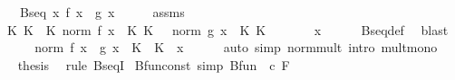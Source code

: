 \begin{isabellebody}
\ \ \ {\isachardoublequoteopen}Bseq\ {\isacharparenleft}{\kern0pt}{\isasymlambda}x{\isachardot}{\kern0pt}\ f\ x\ {\isacharasterisk}{\kern0pt}\ g\ x{\isacharparenright}{\kern0pt}{\isachardoublequoteclose}\isanewline
%
\isadelimproof
%
\endisadelimproof
%
\isatagproof
{}\isamarkupfalse%
\ {\isacharminus}{\kern0pt}\isanewline
\ \ \isamarkupfalse%
\ assms\ \isamarkupfalse%
\ K{}\ K{}\ \ K{\isacharcolon}{\kern0pt}\ {\isachardoublequoteopen}norm\ {\isacharparenleft}{\kern0pt}f\ x{\isacharparenright}{\kern0pt}\ {\isasymle}\ K{}{\isachardoublequoteclose}\ {\isachardoublequoteopen}K{}\ {\isachargreater}{\kern0pt}\ {}{\isachardoublequoteclose}\ {\isachardoublequoteopen}norm\ {\isacharparenleft}{\kern0pt}g\ x{\isacharparenright}{\kern0pt}\ {\isasymle}\ K{}{\isachardoublequoteclose}\ {\isachardoublequoteopen}K{}\ {\isachargreater}{\kern0pt}\ {}{\isachardoublequoteclose}\isanewline
\ \ \ \ \ x\isanewline
\ \ \ \ \isamarkupfalse%
\ Bseq{\isacharunderscore}{\kern0pt}def\ \isamarkupfalse%
\ blast\isanewline
\ \ \isamarkupfalse%
\ \isamarkupfalse%
\ {\isachardoublequoteopen}norm\ {\isacharparenleft}{\kern0pt}f\ x\ {\isacharasterisk}{\kern0pt}\ g\ x{\isacharparenright}{\kern0pt}\ {\isasymle}\ K{}\ {\isacharasterisk}{\kern0pt}\ K{}{\isachardoublequoteclose}\ \ x\isanewline
\ \ \ \ \isamarkupfalse%
\ {\isacharparenleft}{\kern0pt}auto\ simp{\isacharcolon}{\kern0pt}\ norm{\isacharunderscore}{\kern0pt}mult\ intro{\isacharbang}{\kern0pt}{\isacharcolon}{\kern0pt}\ mult{\isacharunderscore}{\kern0pt}mono{\isacharparenright}{\kern0pt}\isanewline
\ \ \isamarkupfalse%
\ \isamarkupfalse%
\ {\isacharquery}{\kern0pt}thesis\ \isamarkupfalse%
\ {\isacharparenleft}{\kern0pt}rule\ BseqI{\isacharprime}{\kern0pt}{\isacharparenright}{\kern0pt}\isanewline
{}\isamarkupfalse%
%
\endisatagproof
{\isafoldproof}%
%
\isadelimproof
\isanewline
%
\endisadelimproof
\isanewline
{}\isamarkupfalse%
\ Bfun{\isacharunderscore}{\kern0pt}const\ {\isacharbrackleft}{\kern0pt}simp{\isacharbrackright}{\kern0pt}{\isacharcolon}{\kern0pt}\ {\isachardoublequoteopen}Bfun\ {\isacharparenleft}{\kern0pt}{\isasymlambda}{\isacharunderscore}{\kern0pt}{\isachardot}{\kern0pt}\ c{\isacharparenright}{\kern0pt}\ F{\isachardoublequoteclose}\isanewline

\end{isabellebody}
